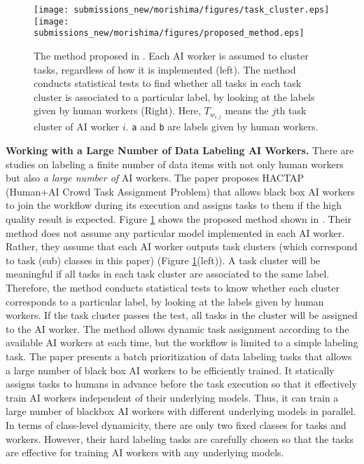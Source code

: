 
\begin{figure}
    \centering
    \texttt{[image: submissions\_new/morishima/figures/task\_cluster.eps]}
    \hspace{10mm}
    \texttt{[image: submissions\_new/morishima/figures/proposed\_method.eps]}
    \caption{The method proposed in \cite{KWM20}. Each AI worker is assumed to cluster tasks, regardless of how it is implemented (left). The method conducts statistical tests to find whether all tasks in each task cluster is associated to a particular label, by looking at the labels given by human workers (Right). Here, $T_{w_{i,j}}$ means the $j$th task cluster of AI worker $i$. {\tt a} and {\tt b} are labels given by human workers.}
    \label{fig:hactap}
\end{figure}

\noindent
{\bf Working with a Large Number of Data Labeling AI Workers.}
There are studies on labeling a finite number of data items with not only human workers but also {\it a large number of} AI workers.
The paper \cite{KWM20} proposes HACTAP  (Human+AI Crowd Task Assignment Problem) that allows black box AI workers to join the workflow during its execution and assigns tasks to them if the high quality result is expected.
Figure \ref{fig:hactap} shows the proposed method shown in \cite{KWM20}.
Their method does not assume any particular model implemented in each AI worker. Rather, they assume that each AI worker outputs task clusters (which correspond to task (sub) classes in this paper) (Figure \ref{fig:hactap}(left)).
A task cluster will be meaningful if all tasks in each task cluster are associated to the same label.  Therefore, the method conducts  statistical tests to know whether each cluster corresponds to a particular label, by looking at the labels given by human workers. If the task cluster passes the test, all tasks in the cluster will be assigned to the AI worker.
The method allows dynamic task assignment according to the available AI workers at each time, but the workflow is limited to a simple labeling task. 
The paper \cite{KWM20b} presents a batch prioritization of data labeling tasks that allows a large number of black box AI workers to be efficiently trained. 
It statically assigns tasks to humans in advance before the task execution so that it effectively train AI workers independent of their underlying models. Thus, it can train a large number of blackbox AI workers with different underlying models in parallel. 
In terms of class-level dynamicity, there are only two fixed classes for tasks and workers. However, their hard labeling tasks are carefully chosen so that the tasks are effective for training AI workers with any underlying models.

